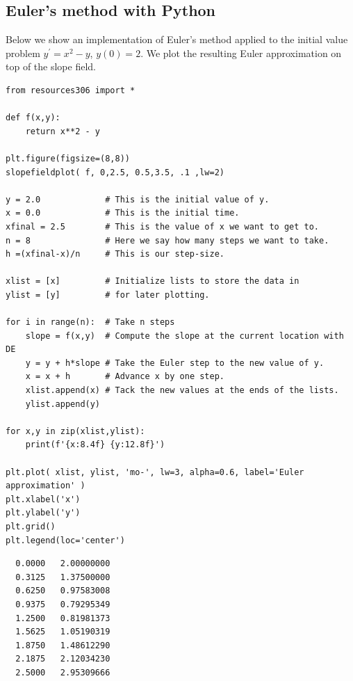 \documentclass[12pt]{book}
\begin{document}

\subsection{Euler's method with Python}

Below we show an implementation of Euler's method applied to the 
initial value problem $y^\prime = x^2 - y$, $y(0)=2$. We plot the resulting Euler approximation on top of the slope field.

\begin{small}
\begin{verbatim}
from resources306 import *

def f(x,y): 
    return x**2 - y

plt.figure(figsize=(8,8))
slopefieldplot( f, 0,2.5, 0.5,3.5, .1 ,lw=2)

y = 2.0             # This is the initial value of y.
x = 0.0             # This is the initial time.
xfinal = 2.5        # This is the value of x we want to get to.
n = 8               # Here we say how many steps we want to take.
h =(xfinal-x)/n     # This is our step-size.

xlist = [x]         # Initialize lists to store the data in
ylist = [y]         # for later plotting.

for i in range(n):  # Take n steps
    slope = f(x,y)  # Compute the slope at the current location with DE
    y = y + h*slope # Take the Euler step to the new value of y.
    x = x + h       # Advance x by one step.
    xlist.append(x) # Tack the new values at the ends of the lists.
    ylist.append(y)

for x,y in zip(xlist,ylist):
    print(f'{x:8.4f} {y:12.8f}')

plt.plot( xlist, ylist, 'mo-', lw=3, alpha=0.6, label='Euler approximation' )
plt.xlabel('x')
plt.ylabel('y')
plt.grid()
plt.legend(loc='center')
\end{verbatim}
\end{small}

\begin{scriptsize}
\begin{verbatim}
  0.0000   2.00000000
  0.3125   1.37500000
  0.6250   0.97583008
  0.9375   0.79295349
  1.2500   0.81981373
  1.5625   1.05190319
  1.8750   1.48612290
  2.1875   2.12034230
  2.5000   2.95309666
\end{verbatim}
\end{scriptsize}
\end{document}
